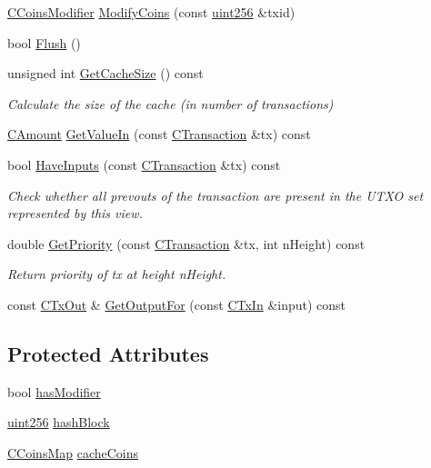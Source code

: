 \begin{DoxyCompactItemize}
\item 
\hyperlink{class_c_coins_modifier}{C\+Coins\+Modifier} \hyperlink{class_c_coins_view_cache_ab67c0d489873ed735c4fc52aa66f0830}{Modify\+Coins} (const \hyperlink{classuint256}{uint256} \&txid)
\item 
bool \hyperlink{class_c_coins_view_cache_ac9888d4feaa46666d03871cd7cd1c01d}{Flush} ()
\item 
unsigned int \hyperlink{class_c_coins_view_cache_a5e8c37ab1b772d00b57e2b40256a4646}{Get\+Cache\+Size} () const 
\begin{DoxyCompactList}\small\item\em Calculate the size of the cache (in number of transactions) \end{DoxyCompactList}\item 
\hyperlink{amount_8h_a4eaf3a5239714d8c45b851527f7cb564}{C\+Amount} \hyperlink{class_c_coins_view_cache_a7fd5ad106e1ac2c2770005672421ff93}{Get\+Value\+In} (const \hyperlink{class_c_transaction}{C\+Transaction} \&tx) const 
\item 
bool \hyperlink{class_c_coins_view_cache_a2b547a48709e9f9af9a4cfc77a328a3f}{Have\+Inputs} (const \hyperlink{class_c_transaction}{C\+Transaction} \&tx) const 
\begin{DoxyCompactList}\small\item\em Check whether all prevouts of the transaction are present in the U\+T\+X\+O set represented by this view. \end{DoxyCompactList}\item 
double \hyperlink{class_c_coins_view_cache_a0ba6f2f115a73a91d3cfb8f59569099d}{Get\+Priority} (const \hyperlink{class_c_transaction}{C\+Transaction} \&tx, int n\+Height) const 
\begin{DoxyCompactList}\small\item\em Return priority of tx at height n\+Height. \end{DoxyCompactList}\item 
const \hyperlink{class_c_tx_out}{C\+Tx\+Out} \& \hyperlink{class_c_coins_view_cache_aa441d7d3869be2f164af1c52a3acb56a}{Get\+Output\+For} (const \hyperlink{class_c_tx_in}{C\+Tx\+In} \&input) const 
\end{DoxyCompactItemize}
\subsection*{Protected Attributes}
\begin{DoxyCompactItemize}
\item 
bool \hyperlink{class_c_coins_view_cache_a363e27234d36bb0fc533d60cd64d1bc3}{has\+Modifier}
\item 
\hyperlink{classuint256}{uint256} \hyperlink{class_c_coins_view_cache_a229dddddbc5501edc250209a2ce5df8b}{hash\+Block}
\item 
\hyperlink{coins_8h_a2886ba2fd0428bae777e1cbcabc02834}{C\+Coins\+Map} \hyperlink{class_c_coins_view_cache_af33cc2c6d38af65ac833d4d13c8e3764}{cache\+Coins}
\end{DoxyCompactItemize}
